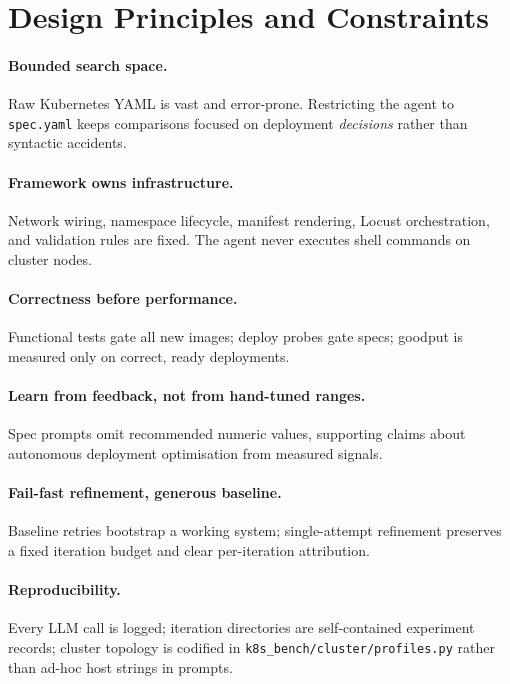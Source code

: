 \section{Design Principles and Constraints}
\label{sec:methods-design}

\paragraph{Bounded search space.}
Raw Kubernetes YAML is vast and error-prone.  Restricting the agent to
\texttt{spec.yaml} keeps comparisons focused on deployment \emph{decisions}
rather than syntactic accidents.

\paragraph{Framework owns infrastructure.}
Network wiring, namespace lifecycle, manifest rendering, Locust orchestration,
and validation rules are fixed.  The agent never executes shell commands on
cluster nodes.

\paragraph{Correctness before performance.}
Functional tests gate all new images; deploy probes gate specs; goodput is
measured only on correct, ready deployments.

\paragraph{Learn from feedback, not from hand-tuned ranges.}
Spec prompts omit recommended numeric values, supporting claims about autonomous
deployment optimisation from measured signals.

\paragraph{Fail-fast refinement, generous baseline.}
Baseline retries bootstrap a working system; single-attempt refinement preserves
a fixed iteration budget and clear per-iteration attribution.

\paragraph{Reproducibility.}
Every LLM call is logged; iteration directories are self-contained experiment
records; cluster topology is codified in \texttt{k8s\_bench/cluster/profiles.py}
rather than ad-hoc host strings in prompts.


